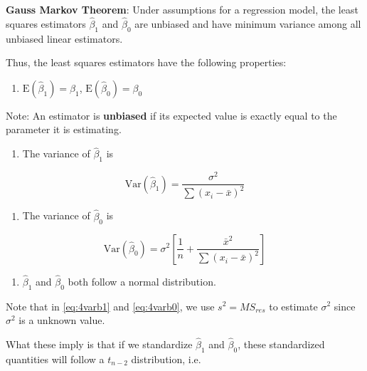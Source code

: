 \documentclass[
]{book}
\providecommand{\tightlist}{%
  \setlength{\itemsep}{0pt}\setlength{\parskip}{0pt}}
\begin{document}
\textbf{Gauss Markov Theorem}: Under assumptions for a regression model, the least squares estimators \(\hat{\beta}_1\) and \(\hat{\beta}_0\) are unbiased and have minimum variance among all unbiased linear estimators.

Thus, the least squares estimators have the following properties:

\begin{enumerate}
\def\labelenumi{\arabic{enumi}.}
\tightlist
\item
  \(\mbox{E}(\hat{\beta}_1) = \beta_1\), \(\mbox{E}(\hat{\beta}_0) = \beta_0\)
\end{enumerate}

Note: An estimator is \textbf{unbiased} if its expected value is exactly equal to the parameter it is estimating.

\begin{enumerate}
\def\labelenumi{\arabic{enumi}.}
\setcounter{enumi}{1}
\tightlist
\item
  The variance of \(\hat{\beta}_1\) is
\end{enumerate}

\begin{equation} 
\mbox{Var}(\hat{\beta}_1) = \frac{\sigma^{2}}{\sum{(x_{i}-\bar{x})^{2}}}
\label{eq:4varb1}
\end{equation}

\begin{enumerate}
\def\labelenumi{\arabic{enumi}.}
\setcounter{enumi}{2}
\tightlist
\item
  The variance of \(\hat{\beta}_0\) is
\end{enumerate}

\begin{equation} 
\mbox{Var}(\hat{\beta}_0) = \sigma^2 \left[\frac{1}{n} + \frac{\bar{x}^2}{\sum (x_i -\bar{x})^2}\right]
\label{eq:4varb0}
\end{equation}

\begin{enumerate}
\def\labelenumi{\arabic{enumi}.}
\setcounter{enumi}{3}
\tightlist
\item
  \(\hat{\beta}_1\) and \(\hat{\beta}_0\) both follow a normal distribution.
\end{enumerate}

Note that in \eqref{eq:4varb1} and \eqref{eq:4varb0}, we use \(s^2 = MS_{res}\) to estimate \(\sigma^2\) since \(\sigma^2\) is a unknown value.

What these imply is that if we standardize \(\hat{\beta}_1\) and \(\hat{\beta}_0\), these standardized quantities will follow a \(t_{n-2}\) distribution, i.e.
\end{document}
